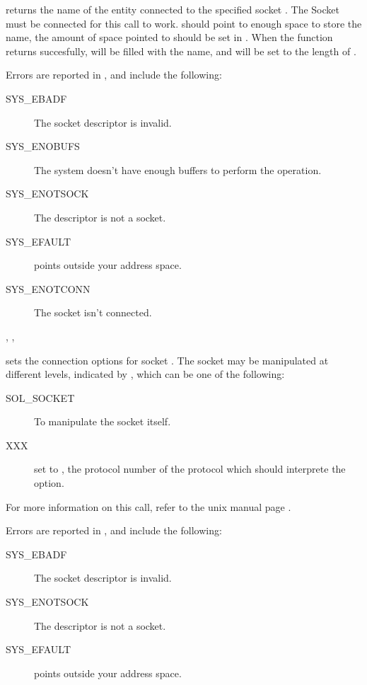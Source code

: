 { returns the name of the entity connected to the 
specified socket . The Socket must be connected for this call to
work. 
 should point to enough space to store the name, the
amount of space pointed to should be set in . 
When the function returns succesfully,  will be filled with the 
name, and  will be set to the length of .
}
{Errors are reported in , and include the following:
\begin{description}
\item[SYS\_EBADF] The socket descriptor is invalid.
\item[SYS\_ENOBUFS] The system doesn't have enough buffers to perform the
operation.
\item[SYS\_ENOTSOCK] The descriptor is not a socket.
\item[SYS\_EFAULT]  points outside your address space.
\item[SYS\_ENOTCONN] The socket isn't connected.
\end{description}
}{, , }

{ sets the connection options for socket .
The socket may be manipulated at different levels, indicated by ,
which can be one of the following:
\begin{description}
\item[SOL\_SOCKET] To manipulate the socket itself. 
\item[XXX] set  to , the protocol number of the protocol
which should interprete the option.
 \end{description}
For more information on this call, refer to the unix manual page .
}
{Errors are reported in , and include the following:
\begin{description}
\item[SYS\_EBADF] The socket descriptor is invalid.
\item[SYS\_ENOTSOCK] The descriptor is not a socket.
\item[SYS\_EFAULT]  points outside your address space.
\end{description}
}
{}

